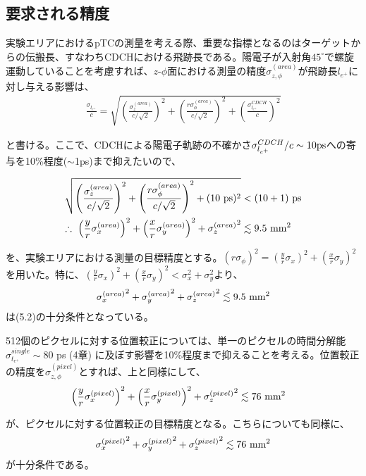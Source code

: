 \documentclass[Yonemoto_master.tex]{subfiles}
\begin{document}
\subsection{要求される精度}
実験エリアにおけるpTCの測量を考える際、重要な指標となるのはターゲットからの伝搬長、すなわちCDCHにおける飛跡長である。陽電子が入射角$45^\circ$で螺旋運動していることを考慮すれば、$z$-$\phi$面における測量の精度$\sigma_{z,\phi}^{(area)}$が飛跡長$l_{e^+}$に対し与える影響は、
\begin{align}
\frac{\sigma_{l_{e^+}}}{c}
= \sqrt{\left(\frac{\sigma_z^{(area)}}{c/\sqrt{2}}\right)^2 + \left(\frac{r\sigma_{\phi}^{(area)}}{c/\sqrt{2}}\right)^2 + \left(\frac{\sigma_{l_{e^+}}^{CDCH}}{c}\right)^2} 
\end{align}

と書ける。ここで、CDCHによる陽電子軌跡の不確かさ$\sigma_{l_{e^+}}^{CDCH}/c \sim 10 \rm ps$への寄与を10\%程度($\sim$1ps)まで抑えたいので、

\begin{align}
\sqrt{\left(\frac{\sigma_z^{(area)}}{c/\sqrt{2}}\right)^2 + \left(\frac{r\sigma_{\phi}^{(area)}}{c/\sqrt{2}}\right)^2 + (10 \ {\rm ps})^2} &< (10 + 1) \ {\rm ps} \nonumber \\
\therefore \ \left(\frac{y}{r}{\sigma_x^{(area)}}\right)^2 + \left(\frac{x}{r}{\sigma_y^{(area)}}\right)^2 + {\sigma_z^{(area)}}^2 &\lesssim 9.5 \ {\rm mm}^2
\end{align}

\noindent を、実験エリアにおける測量の目標精度とする。$\left({r\sigma_{\phi}}\right)^2 = \left(\frac{y}{r}\sigma_x \right)^2 + \left(\frac{x}{r} \sigma_y\right)^2$を用いた。特に、$\left(\frac{y}{r}\sigma_x \right)^2 + \left(\frac{x}{r} \sigma_y\right)^2 < \sigma_x^2 + \sigma_y^2$より、
\begin{align}
{\sigma_x^{(area)}}^2 + {\sigma_y^{(area)}}^2 + {\sigma_z^{(area)}}^2  \lesssim 9.5 \ {\rm mm}^2
\end{align}
は(5.2)の十分条件となっている。

512個のピクセルに対する位置較正については、単一のピクセルの時間分解能$\sigma_{t_{e^+}}^{single} \sim 80$ ps (4章) に及ぼす影響を10\%程度まで抑えることを考える。位置較正の精度を$\sigma_{z,\phi}^{(pixel)}$とすれば、上と同様にして、
\begin{align}
\left(\frac{y}{r}{\sigma_x^{(pixel)}}\right)^2 + \left(\frac{x}{r}{\sigma_y^{(pixel)}}\right)^2 + {\sigma_z^{(pixel)}}^2 &\lesssim 76 \  {\rm mm}^2
\end{align}

\noindent が、ピクセルに対する位置較正の目標精度となる。こちらについても同様に、
\begin{align}
{\sigma_x^{(pixel)}}^2 + {\sigma_y^{(pixel)}}^2 + {\sigma_z^{(pixel)}}^2 \lesssim 76 \ {\rm mm}^2
\end{align}
が十分条件である。
\end{document}
